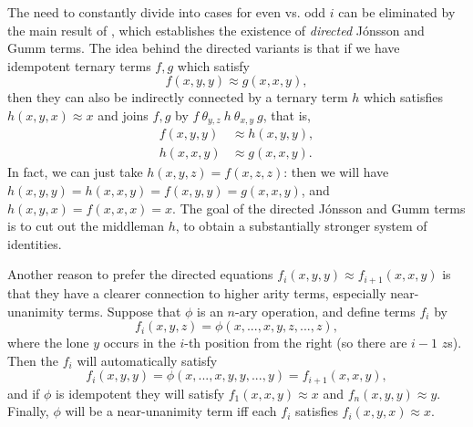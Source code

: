 \documentclass[letterpaper,11pt]{article}
\begin{document}
The need to constantly divide into cases for even vs. odd $i$ can be eliminated by the main result of \cite{directed-gumm}, which establishes the existence of \emph{directed} J\'onsson and Gumm terms. The idea behind the directed variants is that if we have idempotent ternary terms $f,g$ which satisfy
\[
f(x,y,y) \approx g(x,x,y),
\]
then they can also be indirectly connected by a ternary term $h$ which satisfies $h(x,y,x) \approx x$ and joins $f,g$ by $f\ \theta_{y,z}\ h\ \theta_{x,y}\ g$, that is,
\begin{align*}
f(x,y,y) &\approx h(x,y,y),\\
h(x,x,y) &\approx g(x,x,y).
\end{align*}
In fact, we can just take $h(x,y,z) = f(x,z,z)$: then we will have $h(x,y,y) = h(x,x,y) = f(x,y,y) = g(x,x,y)$, and $h(x,y,x) = f(x,x,x) = x$. The goal of the directed J\'onsson and Gumm terms is to cut out the middleman $h$, to obtain a substantially stronger system of identities.

Another reason to prefer the directed equations $f_i(x,y,y) \approx f_{i+1}(x,x,y)$ is that they have a clearer connection to higher arity terms, especially near-unanimity terms. Suppose that $\phi$ is an $n$-ary operation, and define terms $f_i$ by
\[
f_i(x,y,z) = \phi(x,...,x,y,z,...,z),
\]
where the lone $y$ occurs in the $i$-th position from the right (so there are $i-1$ $z$s). Then the $f_i$ will automatically satisfy
\[
f_i(x,y,y) = \phi(x,...,x,y,y,...,y) = f_{i+1}(x,x,y),
\]
and if $\phi$ is idempotent they will satisfy $f_1(x,x,y) \approx x$ and $f_n(x,y,y) \approx y$. Finally, $\phi$ will be a near-unanimity term iff each $f_i$ satisfies $f_i(x,y,x) \approx x$.
\end{document}
